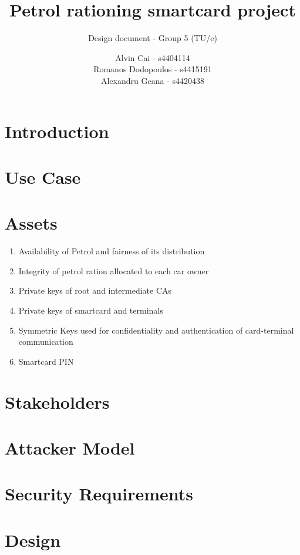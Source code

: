 \documentclass[a4paper,10pt]{llncs}
\title{Petrol rationing smartcard project}
\subtitle{Design document - Group 5 (TU/e)}
\author{Alvin Cai - s4404114 \\ Romanos Dodopoulos - s4415191 \\ Alexandru Geana - s4420438}
\institute{}
\begin{document}
\maketitle

\section{Introduction}


\section{Use Case}


\section{Assets}

\begin{enumerate}
  \item Availability of Petrol and fairness of its distribution
  \item Integrity of petrol ration allocated to each car owner
  \item Private keys of root and intermediate CAs
  \item Private keys of smartcard and terminals
  \item Symmetric Keys used for confidentiality and authentication of card-terminal communication
  \item Smartcard PIN
\end{enumerate}

\section{Stakeholders}


\section{Attacker Model}


\section{Security Requirements}


\section{Design}
\end{document}
